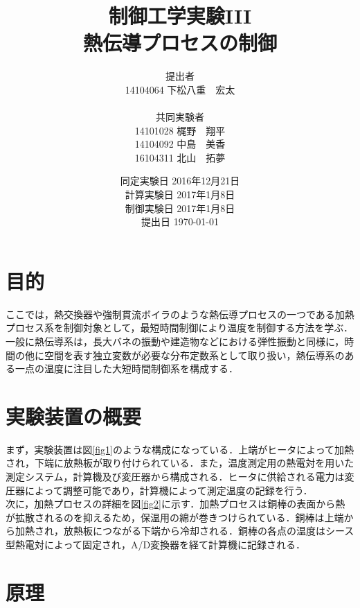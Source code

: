 \documentclass[11pt,a4paper]{jsarticle}
\begin{document}
\title{制御工学実験I\hspace{-0.1mm}I\hspace{-0.1mm}I \\ 熱伝導プロセスの制御}
\author{提出者 \\ 14104064 下松八重　宏太 \\ \\ 共同実験者 \\ 14101028 梶野　翔平 \\ 14104092 中島　美香 \\ 16104311 北山　拓夢}
\date{同定実験日 2016年12月21日 \\ 計算実験日 2017年1月8日 \\ 制御実験日 2017年1月8日 \\ 提出日 \today}



\maketitle
\thispagestyle{empty}
\newpage


\section{目的}
ここでは，熱交換器や強制貫流ボイラのような熱伝導プロセスの一つである加熱プロセス系を制御対象として，最短時間制御により温度を制御する方法を学ぶ．一般に熱伝導系は，長大バネの振動や建造物などにおける弾性振動と同様に，時間の他に空間を表す独立変数が必要な分布定数系として取り扱い，熱伝導系のある一点の温度に注目した大短時間制御系を構成する．

\section{実験装置の概要}
まず，実験装置は図\ref{fig1}のような構成になっている．上端がヒータによって加熱され，下端に放熱板が取り付けられている．また，温度測定用の熱電対を用いた測定システム，計算機及び変圧器から構成される．ヒータに供給される電力は変圧器によって調整可能であり，計算機によって測定温度の記録を行う． \\
次に，加熱プロセスの詳細を図\ref{fig2}に示す．加熱プロセスは銅棒の表面から熱が拡散されるのを抑えるため，保温用の綿が巻きつけられている．銅棒は上端から加熱され，放熱板につながる下端から冷却される．銅棒の各点の温度はシース型熱電対によって固定され，A/D変換器を経て計算機に記録される．

\section{原理}
\end{document}
